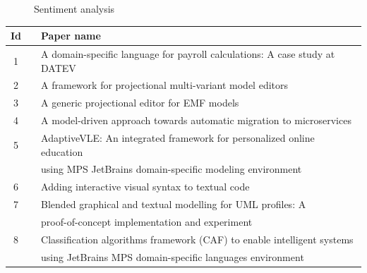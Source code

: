 \begin{figure}[htbp]
    \centering
    \caption{Sentiment analysis}
    \label{fig:sentiment_analysis}
\end{figure}


\begin{table}[htbp]
    \begin{center}
        \begin{tabular}{ |c  c|l | } 
            \hline
            Id  &                                        & Paper name                                                                  \\
            \hline
            1   &  \cite{voelterdomain_SLR}              & A domain-specific language for payroll calculations: A case study at DATEV  \\ \hline
            2   &  \cite{schropfer2021framework_SLR}     & A framework for projectional multi-variant model editors                    \\ \hline
            3   &  \cite{schropfer2020generic_SLR}       & A generic projectional editor for EMF models                                \\ \hline
            4   &  \cite{bucchiarone2019model_SLR}       & A model-driven approach towards automatic migration to microservices        \\ \hline
            5   &  \cite{meacham2020adaptivevle_SLR}     & AdaptiveVLE: An integrated framework for personalized online education      \\
                &                                        & using MPS JetBrains domain-specific modeling environment                    \\ \hline
            6   &  \cite{andersen2020adding_SLR}         & Adding interactive visual syntax to textual code                            \\ \hline
            7   &  \cite{addazi2021blended_SLR}          & Blended graphical and textual modelling for UML profiles: A                 \\
                &                                        & proof-of-concept implementation and experiment                              \\ \hline
            8   & \cite{meacham2020classification_SLR}   & Classification algorithms framework (CAF) to enable intelligent systems     \\
                &                                        & using JetBrains MPS domain-specific languages environment                   \\ \hline

\end{tabular}
\end{center}
\end{table}
